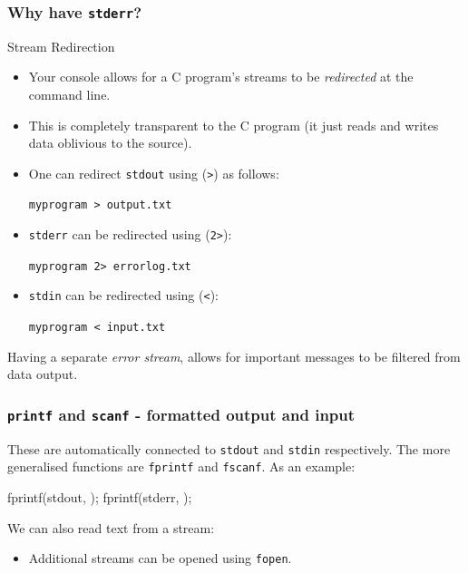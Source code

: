 \documentclass[smaller,handout,table]{beamer}
\begin{document}
\begin{frame}
\frametitle{Why have {\tt stderr}?}
\begin{exampleblock}{Stream Redirection}
\begin{itemize}
\item Your console allows for a C program's streams to be \emph{redirected} at the command line.
\item This is completely transparent to the C program (it just reads and writes data oblivious to the source).
\item One can redirect {\tt stdout} using ({\tt >}) as follows:
\begin{center}
\tt myprogram > output.txt
\end{center}
\item {\tt stderr} can be redirected using ({\tt 2>}):
\begin{center}
\tt myprogram 2> errorlog.txt
\end{center}
\item {\tt stdin} can be redirected using ({\tt <}):
\begin{center}
\tt myprogram < input.txt
\end{center}
\end{itemize}
\end{exampleblock}
Having a separate \emph{error stream}, allows for important messages to be filtered from data output.
\end{frame}


\begin{frame}[fragile]
\frametitle{{\tt printf} and {\tt scanf} - formatted output and input}
These are automatically connected to {\tt stdout} and {\tt stdin} respectively. The more generalised functions are {\tt fprintf} and {\tt fscanf}. As an example:
\begin{semiverbatim}
fprintf(stdout, );
fprintf(stderr, );
\end{semiverbatim}
We can also read text from a stream:
\begin{itemize}
\item Additional streams can be opened using {\tt fopen}.
\end{itemize}
\end{frame}
\end{document}
